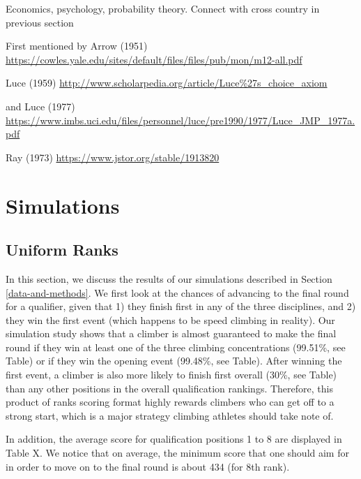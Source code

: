 \documentclass[12pt]{article}
\begin{document}
Economics, psychology, probability theory. Connect with cross country in
previous section

First mentioned by Arrow (1951)
\url{https://cowles.yale.edu/sites/default/files/files/pub/mon/m12-all.pdf}

Luce (1959)
\url{http://www.scholarpedia.org/article/Luce\%27s_choice_axiom}

and Luce (1977)
\url{https://www.imbs.uci.edu/files/personnel/luce/pre1990/1977/Luce_JMP_1977a.pdf}

Ray (1973) \url{https://www.jstor.org/stable/1913820}

\hypertarget{simulations}{%
\section{Simulations}\label{simulations}}

\hypertarget{uniform-ranks}{%
\subsection{Uniform Ranks}\label{uniform-ranks}}

In this section, we discuss the results of our simulations described in
Section \ref{data-and-methods}. We first look at the chances of
advancing to the final round for a qualifier, given that 1) they finish
first in any of the three disciplines, and 2) they win the first event
(which happens to be speed climbing in reality). Our simulation study
shows that a climber is almost guaranteed to make the final round if
they win at least one of the three climbing concentrations (99.51\%, see
Table) or if they win the opening event (99.48\%, see Table). After
winning the first event, a climber is also more likely to finish first
overall (30\%, see Table) than any other positions in the overall
qualification rankings. Therefore, this product of ranks scoring format
highly rewards climbers who can get off to a strong start, which is a
major strategy climbing athletes should take note of.

In addition, the average score for qualification positions 1 to 8 are
displayed in Table X. We notice that on average, the minimum score that
one should aim for in order to move on to the final round is about 434
(for 8th rank).
\end{document}
